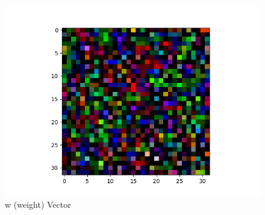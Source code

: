 \documentclass[11pt]{article}
\begin{document}
\begin{figure}[H]
\begin{center}
  \includegraphics[scale=0.45]{w.png}
  \caption{w (weight) Vector}
  \label{fig2F}
\end{center}
\end{figure}
\end{document}
